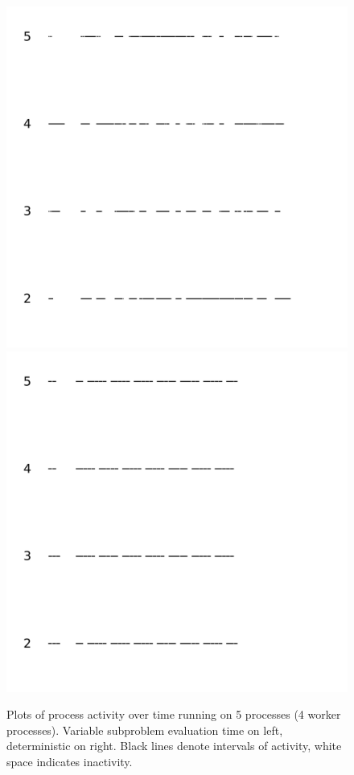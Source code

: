 \documentclass[12pt]{article}
\theoremstyle{definition}
\begin{document}
\begin{figure}[ht]
\includegraphics[scale=0.4]{activityplotnorm}
\includegraphics[scale=0.4]{activityplotdeterm}
\caption{Plots of process activity over time running on 5 processes (4 worker processes). Variable subproblem evaluation time on left, deterministic on right.  Black lines denote intervals of activity, white space indicates inactivity. }\label{fig:act}
\end{figure}
\end{document}
